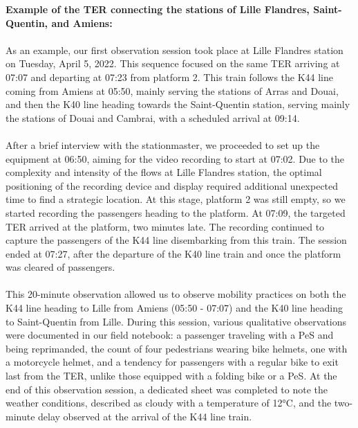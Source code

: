 \begin{refsegment}
\begin{tcolorbox}[colback=white!5!white,
                  colframe=blue!75!blue, 
                  title=
                  \bigskip
                  \center{Illustration of a quantitative observation session}
                  \bigskip]
\normalsize{\textbf{Example of the \acrshort{TER} connecting the stations of Lille Flandres, Saint-Quentin, and Amiens:}}
    \\\\
\small{As an example, our first observation session took place at Lille Flandres station on Tuesday, April 5, 2022. This sequence focused on the same \acrshort{TER} arriving at 07:07 and departing at 07:23 from platform 2. This train follows the K44 line coming from Amiens at 05:50, mainly serving the stations of Arras and Douai, and then the K40 line heading towards the Saint-Quentin station, serving mainly the stations of Douai and Cambrai, with a scheduled arrival at 09:14.}
    \\\\
\small{After a brief interview with the stationmaster, we proceeded to set up the equipment at 06:50, aiming for the video recording to start at 07:02. Due to the complexity and intensity of the flows at Lille Flandres station, the optimal positioning of the recording device and display required additional unexpected time to find a strategic location. At this stage, platform 2 was still empty, so we started recording the passengers heading to the platform. At 07:09, the targeted \acrshort{TER} arrived at the platform, two minutes late. The recording continued to capture the passengers of the K44 line disembarking from this train. The session ended at 07:27, after the departure of the K40 line train and once the platform was cleared of passengers.}
    \\\\
\small{This 20-minute observation allowed us to observe mobility practices on both the K44 line heading to Lille from Amiens (05:50 - 07:07) and the K40 line heading to Saint-Quentin from Lille. During this session, various qualitative observations were documented in our field notebook: a passenger traveling with a \acrfull{PeS} and being reprimanded, the count of four pedestrians wearing bike helmets, one with a motorcycle helmet, and a tendency for passengers with a regular bike to exit last from the \acrshort{TER}, unlike those equipped with a folding bike or a \acrfull{PeS}. At the end of this observation session, a dedicated sheet was completed to note the weather conditions, described as cloudy with a temperature of 12°C, and the two-minute delay observed at the arrival of the K44 line train.}
    \end{tcolorbox}


\end{refsegment}
